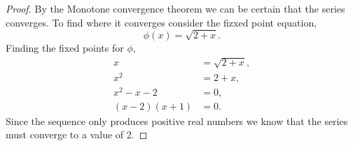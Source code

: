 \documentclass[12pt]{article}
\makeatletter
\theoremstyle{homework}
\newenvironment{exercise}[1]
{\def\@currentlabel{#1}\exercisecore}
{\endexercisecore}
\makeatother
\begin{document}
\begin{exercise}{2.4.3(a)}
\begin{proof}
    By the Monotone convergence theorem we can be certain that the series converges. To find where it converges consider the fizxed point equation,
    \begin{equation*}
      \phi(x) = \sqrt{2 + x}.
    \end{equation*}
    Finding the fixed points for $\phi$,
    \begin{align*}
      x &= \sqrt{2+ x},\\
      x^2 &= 2 + x,\\
      x^2 - x - 2  &= 0,\\
      (x-2)(x+1) &= 0.
    \end{align*}
Since the sequence only produces positive real numbers we know that the series must converge to a value of 2.
  \end{proof}
\end{exercise}
\end{document}
